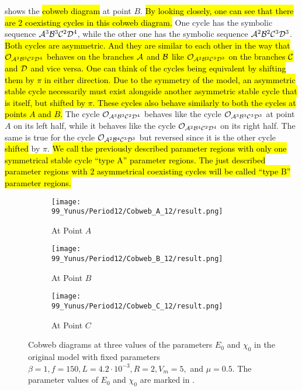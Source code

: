  shows the \hl{cobweb diagram} at point $B$.
\hl{By looking closely, one can see that there are 2 coexisting cycles in this cobweb diagram.}
One cycle has the symbolic sequence $\mathcal{A}^3\mathcal{B}^3\mathcal{C}^2\mathcal{D}^4$, while the other one has the symbolic sequence $\mathcal{A}^2\mathcal{B}^2\mathcal{C}^3\mathcal{D}^3$.
\hl{
	Both cycles are asymmetric.
	And they are similar to each other in the way that $\mathcal{O}_{\mathcal{A}^3\mathcal{B}^3\mathcal{C}^2\mathcal{D}^4}$ behaves on the branches $\mathcal{A}$ and $\mathcal{B}$ like $\mathcal{O}_{\mathcal{A}^2\mathcal{B}^2\mathcal{C}^3\mathcal{D}^3}$ on the branches $\mathcal{C}$ and $\mathcal{D}$ and vice versa.
	One can think of the cycles being equivalent by shifting them by $\pi$ in either direction.
	Due to the symmetry of the model, an asymmetric stable cycle necessarily must exist alongside another asymmetric stable cycle that is itself, but shifted by $\pi$.
	These cycles also behave similarly to both the cycles at points $A$ and $B$.
}
The cycle $\mathcal{O}_{\mathcal{A}^3\mathcal{B}^3\mathcal{C}^2\mathcal{D}^4}$ behaves like the cycle $\mathcal{O}_{\mathcal{A}^3\mathcal{B}^3\mathcal{C}^3\mathcal{D}^3}$ at point $A$ on its left half, while it behaves like the cycle $\mathcal{O}_{\mathcal{A}^2\mathcal{B}^4\mathcal{C}^2\mathcal{D}^4}$ on its right half.
The same is true for the cycle $\mathcal{O}_{\mathcal{A}^2\mathcal{B}^4\mathcal{C}^3\mathcal{D}^3}$ but reversed since it is the other cycle \hl{shifted} by $\pi$.
\hl{
	We call the previously described parameter regions with only one symmetrical stable cycle ``type A'' parameter regions.
	The just described parameter regions with 2 asymmetrical coexisting cycles will be called ``type B'' parameter regions.
}

\begin{figure}
	\centering
	\begin{subfigure}{0.3\textwidth}
		\centering
		\texttt{[image: 99\_Yunus/Period12/Cobweb\_A\_12/result.png]}
		\caption{At Point $A$}
		\label{fig:setup.og.dynamics.cobweb.A}
	\end{subfigure}
	\begin{subfigure}{0.3\textwidth}
		\centering
		\texttt{[image: 99\_Yunus/Period12/Cobweb\_B\_12/result.png]}
		\caption{At Point $B$}
		\label{fig:setup.og.dynamics.cobweb.B}
	\end{subfigure}
	\begin{subfigure}{0.3\textwidth}
		\centering
		\texttt{[image: 99\_Yunus/Period12/Cobweb\_C\_12/result.png]}
		\caption{At Point $C$}
		\label{fig:setup.og.dynamics.cobweb.C}
	\end{subfigure}
	\caption[Cobweb diagrams of the original model]{
		Cobweb diagrams at three values of the parameters $E_0$ and $\chi_0$ in the original model with fixed parameters $\beta = 1, f = 150, L = 4.2 \cdot 10^{-3}, R = 2, V_m = 5,$ and $\mu = 0.5$.
		The parameter values of $E_0$ and $\chi_0$ are marked in .
	}
	\label{fig:setup.og.dynamics.cobwebs}
\end{figure}

